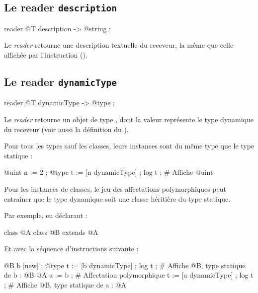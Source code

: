 \subsection{Le reader \texttt{description}}

\begin{galgascode}
reader @T description -> @string ;
\end{galgascode}

Le \emph{reader}  retourne une description textuelle du receveur, la même que celle affichée par l'instruction  ().



\subsection{Le reader \texttt{dynamicType}}

\begin{galgascode}
reader @T dynamicType -> @type ;
\end{galgascode}

Le \emph{reader}  retourne un objet de type , dont la valeur représente le type dynamique du receveur (voir aussi la définition du ).

Pour tous les types sauf les classes, leurs instances sont du même type que le type statique :

\begin{galgascode}
@uint n := 2 ;
@type t := [n dynamicType] ;
log t ; # Affiche @uint
\end{galgascode}

Pour les instances de classes, le jeu des affectations polymorphiques peut entraîner que le type dynamique soit une classe héritière du type statique.

Par exemple, en déclarant :
\begin{galgascode}
class @A { }
class @B extends @A { }
\end{galgascode}

Et avec la séquence d'instructions suivante :
\begin{galgascode}
@B b [new] ;
@type t := [b dynamicType] ;
log t ; # Affiche @B, type statique de b : @B
@A a := b ; # Affectation polymorphique
t := [a dynamicType] ;
log t ; # Affiche @B, type statique de a : @A
\end{galgascode}





